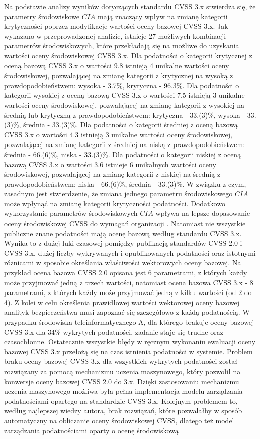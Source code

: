 \bigbreak
Na podstawie analizy wyników dotyczących standardu CVSS 3.x stwierdza się, że parametry środowiskowe $CIA$ mają znaczący wpływ na zmianę kategorii krytyczności poprzez modyfikacje wartości oceny bazowej CVSS 3.x. Jak wykazano w przeprowadzonej analizie, istnieje 27 możliwych kombinacji parametrów środowiskowych, które przekładają się na możliwe do uzyskania wartości oceny środowiskowej CVSS 3.x. Dla podatności o kategorii krytycznej z oceną bazową CVSS 3.x o wartości 9.8 istnieją 4 unikalne wartości oceny środowiskowej, pozwalającej na zmianę kategorii z krytycznej na wysoką z prawdopodobieństwem: wysoka - 3.7\%, krytyczna - 96.3\%. Dla podatności o kategorii wysokiej z oceną bazową CVSS 3.x o wartości 7.5 istnieją 3 unikalne wartości oceny środowiskowej, pozwalającej na zmianę kategorii z wysokiej na średnią lub krytyczną z prawdopodobieństwem: krytyczna - 33.(3)\%, wysoka - 33.(3)\%, średnia - 33.(3)\%. Dla podatności o kategorii średniej z oceną bazową CVSS 3.x o wartości 4.3 istnieją 3 unikalne wartości oceny środowiskowej, pozwalającej na zmianę kategorii z średniej na niską z prawdopodobieństwem: średnia - 66.(6)\%, niska - 33.(3)\%. Dla podatności o kategorii niskiej z oceną bazową CVSS 3.x o wartości 3.6 istnieje 6 unikalnych wartości oceny środowiskowej, pozwalającej na zmianę kategorii z niskiej na średnią z prawdopodobieństwem: niska - 66.(6)\%, średnia - 33.(3)\%. W związku z czym, zasadnym jest stwierdzenie, że zmiana jednego parametru środowiskowego $CIA$ może wpłynąć na zmianę kategorii krytyczności podatności. Dodatkowo wykorzystanie parametrów środowiskowych $CIA$ wpływa na lepsze dopasowanie oceny środowiskowej CVSS do wymagań organizacji \cite{fruhwirth2009improving, wang2015vulnerability, gallon2010impact}. Natomiast nie wszystkie publiczne znane podatności mają ocenę bazową według standardu CVSS 3.x. Wynika to z dużej luki czasowej pomiędzy publikacją standardów CVSS 2.0 i CVSS 3.x, dużej liczby wykrywanych i opublikowanych podatności oraz istotnymi różnicami w sposobie określania właściwości wektorowych oceny bazowej. Na przykład ocena bazowa CVSS 2.0 opisana jest 6 parametrami, z których każdy może przyjmować jedną z trzech wartości, natomiast ocena bazowa CVSS 3.x - 8 parametrami, z których każdy może przyjmować jedną z kilku wartości (od 2 do 4). Z kolei w celu określenia prawidłowej wartości wektorowej oceny bazowej analityk bezpieczeństwa musi zapoznać się szczegółowo z każdą podatnością. W przypadku środowiska teleinformatycznego A, dla którego brakuje oceny bazowej CVSS 3.x dla 34\% wykrytych podatności, zadanie staje się trudne oraz czasochłonne. Ostatecznie wszystkie błędy w ręcznym wykonaniu ewaluacji oceny bazowej CVSS 3.x przełożą się na czas istnienia podatności w systemie. Problem braku oceny bazowej CVSS 3.x dla wszystkich wykrytych podatności został rozwiązany za pomocą mechanizmu uczenia maszynowego, który pozwolił na konwersje oceny bazowej CVSS 2.0 do 3.x. Dzięki zastosowaniu mechanizmu uczenia maszynowego możliwa była pełna implementacja modelu zarządzania podatnościami opartego na standardzie CVSS 3.x. Kolejnym problemem to, według najlepszej wiedzy autora, brak rozwiązań, które pozwalałby w sposób automatyczny na obliczanie oceny środowiskowej CVSS, dlatego też model zarządzania podatnościami oparty o ocenę środowiskową 